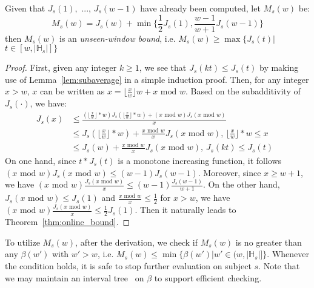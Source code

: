 \begin{theorem}
\label{thm:unseen_window_bound}
Given that $J_s(1),$ ..., $J_s(w-1)$ have already been computed, 
let $M_s(w)$ be:
\begin{equation}
M_s(w) = J_s(w) + \min\{\frac{1}{2}J_s(1),\frac{w-1}{w+1}J_s(w-1)\}
\end{equation} 
then $M_s(w)$ is an \emph{unseen-window bound}, i.e. $M_s(w) \geq \max\{J_s(t) | $ $ t\in [w,|\mathbb{H}_s|]\}$
\end{theorem}
\begin{proof}
First, given any integer $k \geq 1$, we see that $J_s(kt) \leq J_s(t)$ 
by making use of Lemma~\ref{lem:subaverage} in a simple induction proof. 
Then, for any integer $x > w$, 
$x$ can be written as $x =\lfloor \frac{x}{w} \rfloor w + x \text{ mod } w$. 
Based on the subadditivity of $J_s(\cdot)$, we have: 
\begin{align*}
J_s(x) &\leq \frac{(\lfloor \frac{x}{w}  \rfloor *w) J_s(\lfloor \frac{x}{w}  \rfloor*w) + (x \text{ mod } w ) J_s(x \text{ mod } w)}{x} \\
&\leq J_s(\lfloor \frac{x}{w}  \rfloor*w) + \frac{x \text{ mod } w}{x} J_s(x \text{ mod } w) \text{, $\lfloor \frac{x}{w}  \rfloor * w \leq x $} \\
&\leq J_s(w) + \frac{x \text{ mod } w}{x} J_s(x \text{ mod } w) \text{, $J_s(kt) \leq J_s(t)$ }
\end{align*}
On one hand, since $t*J_s(t)$ is a monotone increasing function, it follows $(x \text{ mod } w)J_s(x \text{ mod } w) \leq (w-1)J_s(w-1)$. 
Moreover, since $x \geq w+1$, we have $(x \text{ mod } w)\frac{J_s(x \text{ mod } w)}{x}\leq (w-1)\frac{J_s(w-1)}{w+1}$. On the other hand, $J_s(x \text{ mod } w)\leq J_s(1)$ and $\frac{x \text{ mod } w}{x} \leq \frac{1}{2}$ for $x > w$, we have $(x \text{ mod } w)\frac{J_s(x \text{ mod } w)}{x} \leq \frac{1}{2}J_s(1)$.
Then it naturally leads to Theorem~\ref{thm:online_bound}. 
\end{proof}


To utilize $M_s(w)$, after the derivation, we check if $M_s(w)$ is no greater  
than any $\beta(w')$ with $w' >w$,  i.e. $M_s(w) \leq \min\{\beta(w')|w' \in (w ,|\mathbb{H}_s|]\}$. Whenever the condition holds, it is safe to stop further evaluation on subject $s$.
Note that we may maintain an interval tree~\cite{Berg1997Computational} 
on $\beta$ to support efficient checking. 


